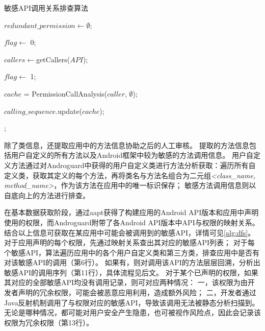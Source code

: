 \begin{algorithm}[!ht]
    \tablewuhao
    \caption{敏感API调用关系排查算法}
    \label{alg:dfs}

     {

        $redundant\_permission \gets \emptyset$;

         {

            $flag \gets$ 0;

             {

                $callers \gets $getCallers($API$);

                 {

                    $flag \gets$ 1;

                }

                 {

                    $cache$ = PermissionCallAnalysis($caller$, $\emptyset$);

                    $calling\_sequence$.update($cache$);

                }
            }


        }
        ;

    }
\end{algorithm}

除了类信息，\componentC 还提取应用中的方法信息协助之后的人工审核。
提取的方法信息包括用户自定义的所有方法以及Android框架中较为敏感的方法调用信息。
用户自定义方法通过对Androguard中获得的用户自定义类进行方法分析获取：\componentC 遍历所有自定义类，获取其定义的每个方法，再将类名与方法名组合为二元组\textit{<class\_name, method\_name>}，作为该方法在应用中的唯一标识保存；
敏感方法调用信息则以自底向上的方法进行排查。

在基本数据获取阶段，\componentC 通过aapt获得了构建应用的Android API版本和应用中声明使用的权限，而Androguard附带了各Android API版本中API与权限的映射关系。
结合以上信息可获取在某应用中可能会被调用到的敏感API，详情可见\autoref{alg:dfs}。
对于应用声明的每个权限，先通过映射关系查出其对应的敏感API列表；
对于每个敏感API，算法遍历应用中的各个用户自定义类和第三方类，排查应用中是否有对该敏感API的调用（第6行）。
如果有，则对调用该API的方法层层回溯，分析出敏感API的调用序列（第11行），具体流程见后文。
对于某个已声明的权限，如果其对应的全部敏感API均没有调用记录，则可对应两种情况：
一，该权限为由开发者声明的冗余权限，可能会被恶意应用利用，造成额外风险；
二，开发者通过Java反射机制调用了与权限对应的敏感API，导致该调用无法被静态分析扫描到。
无论是哪种情况，都可能对用户安全产生隐患，也可被视作风险点，因此\componentC 会记录该权限为冗余权限（第13行）。

